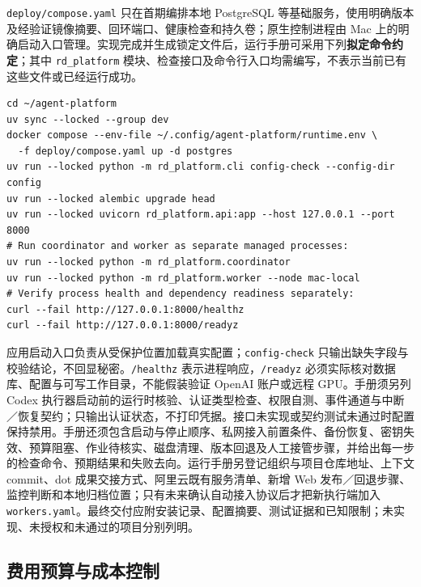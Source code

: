 \documentclass[11pt,a4paper]{article}
\begin{document}
\texttt{deploy/compose.yaml} 只在首期编排本地 PostgreSQL 等基础服务，使用明确版本及经验证镜像摘要、回环端口、健康检查和持久卷；原生控制进程由 Mac 上的明确启动入口管理。实现完成并生成锁定文件后，运行手册可采用下列\textbf{拟定命令约定}；其中 \texttt{rd\_platform} 模块、检查接口及命令行入口均需编写，不表示当前已有这些文件或已经运行成功。

\par\noindent\begin{minipage}{\linewidth}
\begin{lstlisting}
cd ~/agent-platform
uv sync --locked --group dev
docker compose --env-file ~/.config/agent-platform/runtime.env \
  -f deploy/compose.yaml up -d postgres
uv run --locked python -m rd_platform.cli config-check --config-dir config
uv run --locked alembic upgrade head
uv run --locked uvicorn rd_platform.api:app --host 127.0.0.1 --port 8000
# Run coordinator and worker as separate managed processes:
uv run --locked python -m rd_platform.coordinator
uv run --locked python -m rd_platform.worker --node mac-local
# Verify process health and dependency readiness separately:
curl --fail http://127.0.0.1:8000/healthz
curl --fail http://127.0.0.1:8000/readyz
\end{lstlisting}
\end{minipage}\par


应用启动入口负责从受保护位置加载真实配置；\texttt{config-check} 只输出缺失字段与校验结论，不回显秘密。\texttt{/healthz} 表示进程响应，\texttt{/readyz} 必须实际核对数据库、配置与可写工作目录，不能假装验证 OpenAI 账户或远程 GPU。手册须另列 Codex 执行器启动前的运行时核验、认证类型检查、权限自测、事件通道与中断／恢复契约；只输出认证状态，不打印凭据。接口未实现或契约测试未通过时配置保持禁用。手册还须包含启动与停止顺序、私网接入前置条件、备份恢复、密钥失效、预算阻塞、作业待核实、磁盘清理、版本回退及人工接管步骤，并给出每一步的检查命令、预期结果和失败去向。运行手册另登记组织与项目仓库地址、上下文 commit、dot 成果交接方式、阿里云既有服务清单、新增 Web 发布／回退步骤、监控判断和本地归档位置；只有未来确认自动接入协议后才把新执行端加入 \texttt{workers.yaml}。最终交付应附安装记录、配置摘要、测试证据和已知限制；未实现、未授权和未通过的项目分别列明。


\newpage


\subsection{费用预算与成本控制}
\label{sec:impl-budget}
\end{document}
